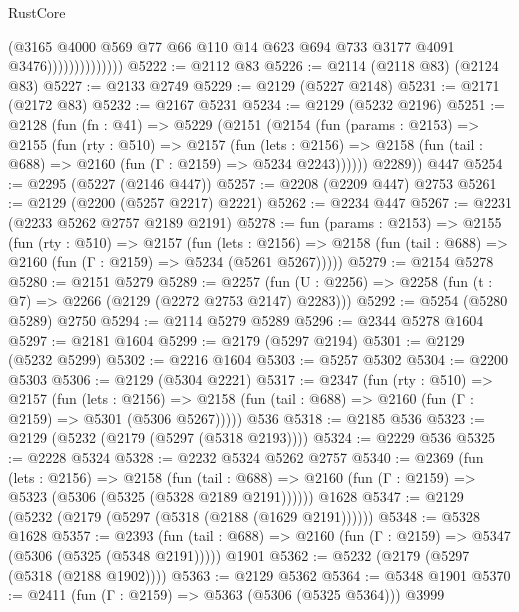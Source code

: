 \begin{lexlean}{RustCore}
\begin{coremodule}
                              (@3165
                                @4000
                                @569
                                @77
                                @66
                                @110
                                @14
                                @623
                                @694
                                @733
                                @3177
                                @4091
                                @3476))))))))))))))
@5222 := @2112 @83
@5226 := @2114 (@2118 @83) (@2124 @83)
@5227 := @2133 @2749
@5229 := @2129 (@5227 @2148)
@5231 := @2171 (@2172 @83)
@5232 := @2167 @5231
@5234 := @2129 (@5232 @2196)
@5251 := @2128
    (fun (fn : @41) =>
    @5229
      (@2151
        (@2154
          (fun (params : @2153) =>
          @2155
            (fun (rty : @510) =>
            @2157
              (fun (lets : @2156) =>
              @2158 (fun (tail : @688) => @2160 (fun (Γ : @2159) => @5234 @2243))))))
        @2289))
    @447
@5254 := @2295 (@5227 (@2146 @447))
@5257 := @2208 (@2209 @447) @2753
@5261 := @2129 (@2200 (@5257 @2217) @2221)
@5262 := @2234 @447
@5267 := @2231 (@2233 @5262 @2757 @2189 @2191)
@5278 := fun (params : @2153) =>
  @2155
    (fun (rty : @510) =>
    @2157
      (fun (lets : @2156) =>
      @2158 (fun (tail : @688) => @2160 (fun (Γ : @2159) => @5234 (@5261 @5267)))))
@5279 := @2154 @5278
@5280 := @2151 @5279
@5289 := @2257 (fun (U : @2256) => @2258 (fun (t : @7) => @2266 (@2129 (@2272 @2753 @2147) @2283)))
@5292 := @5254 (@5280 @5289) @2750
@5294 := @2114 @5279 @5289
@5296 := @2344 @5278 @1604
@5297 := @2181 @1604
@5299 := @2179 (@5297 @2194)
@5301 := @2129 (@5232 @5299)
@5302 := @2216 @1604
@5303 := @5257 @5302
@5304 := @2200 @5303
@5306 := @2129 (@5304 @2221)
@5317 := @2347
    (fun (rty : @510) =>
    @2157
      (fun (lets : @2156) =>
      @2158 (fun (tail : @688) => @2160 (fun (Γ : @2159) => @5301 (@5306 @5267)))))
    @536
@5318 := @2185 @536
@5323 := @2129 (@5232 (@2179 (@5297 (@5318 @2193))))
@5324 := @2229 @536
@5325 := @2228 @5324
@5328 := @2232 @5324 @5262 @2757
@5340 := @2369
    (fun (lets : @2156) =>
    @2158
      (fun (tail : @688) => @2160 (fun (Γ : @2159) => @5323 (@5306 (@5325 (@5328 @2189 @2191))))))
    @1628
@5347 := @2129 (@5232 (@2179 (@5297 (@5318 (@2188 (@1629 @2191))))))
@5348 := @5328 @1628
@5357 := @2393
    (fun (tail : @688) => @2160 (fun (Γ : @2159) => @5347 (@5306 (@5325 (@5348 @2191)))))
    @1901
@5362 := @5232 (@2179 (@5297 (@5318 (@2188 @1902))))
@5363 := @2129 @5362
@5364 := @5348 @1901
@5370 := @2411 (fun (Γ : @2159) => @5363 (@5306 (@5325 @5364))) @3999

\end{coremodule}
\end{lexlean}
